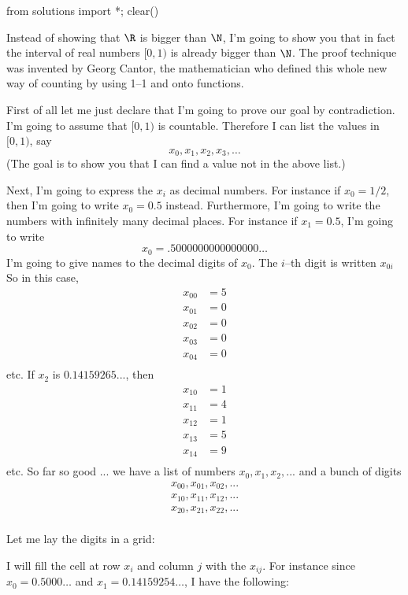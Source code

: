 \begin{python0}
from solutions import *; clear()
\end{python0}

Instead of showing that $\R$ is bigger than $\N$, I'm going to show 
you that in fact the interval of real numbers 
$[0, 1)$ is already bigger than $\N$.
The proof technique was invented by Georg Cantor, the mathematician
who defined this whole new way of counting by using 1--1 and onto functions.

First of all let me just declare that I'm going to prove our goal by 
contradiction.
I'm going to assume that $[0,1)$ is countable.
Therefore I can list the values in $[0,1)$, say
\[
x_0, x_1, x_2, x_3, \ldots
\]
(The goal
is to show you that I can find a value not in the above list.)

Next, I'm going to express the $x_i$ as decimal numbers.
For instance if $x_0 = 1/2$, then I'm going to write $x_0 = 0.5$ instead.
Furthermore, I'm going to write the numbers with infinitely many decimal
places.
For instance if $x_1 = 0.5$, I'm going to write
\[
x_0 = .5000000000000000\ldots
\]
I'm going to give names to the decimal digits of $x_0$.
The $i$--th digit is written $x_{0i}$
So in this case,
\begin{align*}
x_{00} &= 5 \\
x_{01} &= 0 \\
x_{02} &= 0 \\
x_{03} &= 0 \\
x_{04} &= 0 \\
\end{align*}
etc.
If $x_2$ is $0.14159265...$, then
\begin{align*}
x_{10} &= 1 \\
x_{11} &= 4 \\
x_{12} &= 1 \\
x_{13} &= 5 \\
x_{14} &= 9 \\
\end{align*}
etc.
So far so good ... we have a list of numbers $x_0, x_1, x_2, ...$ 
and a bunch of digits
\begin{align*}
x_{00}, x_{01}, x_{02}, ... \\
x_{10}, x_{11}, x_{12}, ... \\
x_{20}, x_{21}, x_{22}, ... \\
\end{align*}

Let me lay the digits in a grid:

I will fill the cell at row $x_i$ and column $j$ with the $x_{ij}$.
For instance since $x_0 = 0.5000\ldots$ and $x_1 = 0.14159254\ldots$,
I have the following:


